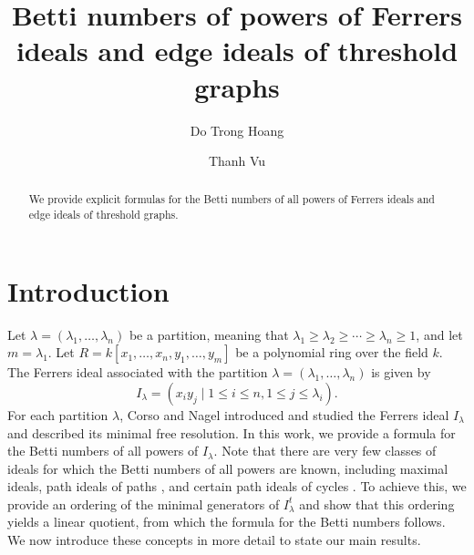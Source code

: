 \documentclass[12pt,amscd]{amsart}
\theoremstyle{definition}
\numberwithin{equation}{section}
\begin{document}
\title{Betti numbers of powers of Ferrers ideals and edge ideals of threshold graphs}

\author{Do Trong Hoang}
\address{Faculty of  Mathematics and Informatics, Hanoi University of Science and Technology, 1 Dai Co Viet, Bach Mai, Hanoi, Vietnam.}


 
\author{Thanh Vu}
\address{Institute of Mathematics, VAST, 18 Hoang Quoc Viet, Hanoi, Vietnam}



\date{}

 
\commby{}
  \begin{abstract}
  We  provide explicit formulas for   the Betti numbers of all powers of Ferrers ideals and    edge ideals  of   threshold graphs.  
\end{abstract}

 

\maketitle
 

\section{Introduction}
Let $\lambda = (\lambda_1, \ldots, \lambda_n)$ be a partition, meaning that $\lambda_1 \ge \lambda_2 \ge \cdots \ge \lambda_n \ge 1$, and let $m = \lambda_1$. Let $R = k[x_1, \ldots, x_n, y_1, \ldots, y_m]$ be a polynomial ring over the field $k$. The Ferrers ideal associated with the partition $\lambda = (\lambda_1, \ldots, \lambda_n)$  is given by 
$$I_\lambda = (x_iy_j \mid 1 \le i \le n, 1 \le j \le \lambda_i).$$ 
For each partition $\lambda$, Corso and Nagel \cite{CN1} introduced and studied the Ferrers ideal $I_\lambda$ and described its minimal free resolution. In this work, we provide a formula for the Betti numbers of all powers of $I_\lambda$. Note that there are very few classes of ideals for which the Betti numbers of all powers are known, including maximal ideals, path ideals of paths \cite{BCV1}, and certain path ideals of cycles \cite{BCV2}. To achieve this, we provide an ordering of the minimal generators of $I_\lambda^t$ and show that this ordering yields a linear quotient, from which the formula for the Betti numbers follows. We now introduce these concepts in more detail to state our main results.
\end{document}
